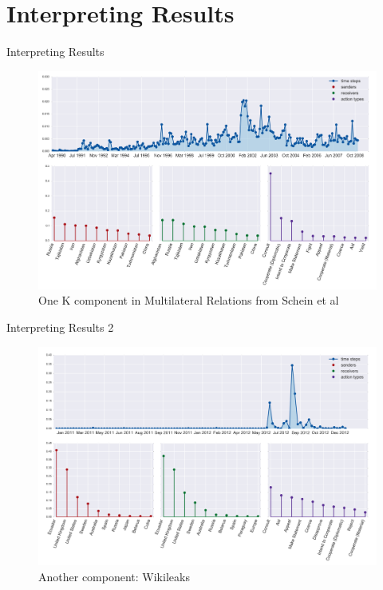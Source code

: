 \documentclass[xcolor=svgnames]{beamer}
\begin{document}
\section{Interpreting Results}
\begin{frame}{Interpreting Results}
	\begin{figure}[h]
	\centering
	\includegraphics[width=\linewidth]{multilateral}
	\caption{One K component in Multilateral Relations from Schein et al}
	\end{figure}
\end{frame}

\begin{frame}{Interpreting Results 2}
	\begin{figure}[h]
	\centering
	\includegraphics[width=\linewidth]{multilateral2}
	\caption{Another component: Wikileaks}
	\end{figure}
\end{frame}
\end{document}
